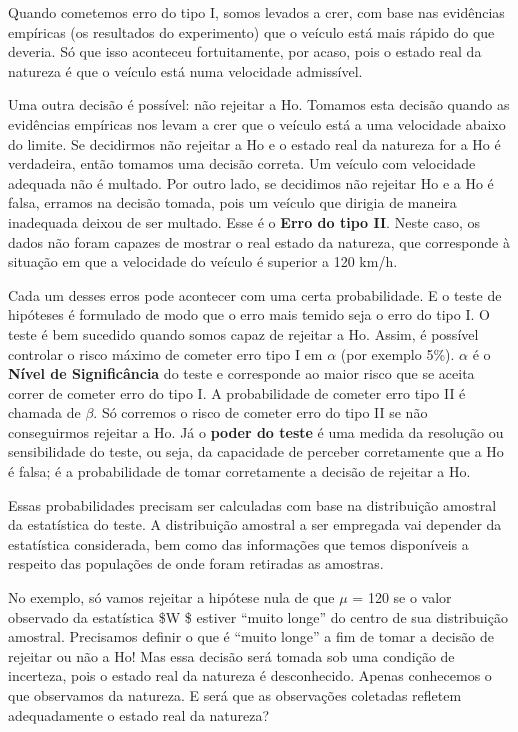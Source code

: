 \documentclass[
]{book}
\theoremstyle{definition}
\theoremstyle{definition}
\theoremstyle{definition}
\theoremstyle{remark}
\begin{document}
Quando cometemos erro do tipo I, somos levados a crer, com base nas evidências empíricas (os resultados do experimento) que o veículo está mais rápido do que deveria. Só que isso aconteceu fortuitamente, por acaso, pois o estado real da natureza é que o veículo está numa velocidade admissível.

Uma outra decisão é possível: não rejeitar a Ho. Tomamos esta decisão quando as evidências empíricas nos levam a crer que o veículo está a uma velocidade abaixo do limite. Se decidirmos não rejeitar a Ho e o estado real da natureza for a Ho é verdadeira, então tomamos uma decisão correta. Um veículo com velocidade adequada não é multado. Por outro lado, se decidimos não rejeitar Ho e a Ho é falsa, erramos na decisão tomada, pois um veículo que dirigia de maneira inadequada deixou de ser multado. Esse é o \textbf{Erro do tipo II}. Neste caso, os dados não foram capazes de mostrar o real estado da natureza, que corresponde à situação em que a velocidade do veículo é superior a 120 km/h.

Cada um desses erros pode acontecer com uma certa probabilidade. E o teste de hipóteses é formulado de modo que o erro mais temido seja o erro do tipo I. O teste é bem sucedido quando somos capaz de rejeitar a Ho. Assim, é possível controlar o risco máximo de cometer erro tipo I em \(\alpha\) (por exemplo 5\%). \(\alpha\) é o \textbf{Nível de Significância} do teste e corresponde ao maior risco que se aceita correr de cometer erro do tipo I. A probabilidade de cometer erro tipo II é chamada de \(\beta\). Só corremos o risco de cometer erro do tipo II se não conseguirmos rejeitar a Ho. Já o \textbf{poder do teste} é uma medida da resolução ou sensibilidade do teste, ou seja, da capacidade de perceber corretamente que a Ho é falsa; é a probabilidade de tomar corretamente a decisão de rejeitar a Ho.

Essas probabilidades precisam ser calculadas com base na distribuição amostral da estatística do teste. A distribuição amostral a ser empregada vai depender da estatística considerada, bem como das informações que temos disponíveis a respeito das populações de onde foram retiradas as amostras.

No exemplo, só vamos rejeitar a hipótese nula de que \(\mu\) = 120 se o valor observado da estatística \$W \$ estiver ``muito longe'' do centro de sua distribuição amostral. Precisamos definir o que é ``muito longe'' a fim de tomar a decisão de rejeitar ou não a Ho! Mas essa decisão será tomada sob uma condição de incerteza, pois o estado real da natureza é desconhecido. Apenas conhecemos o que observamos da natureza. E será que as observações coletadas refletem adequadamente o estado real da natureza?
\end{document}

